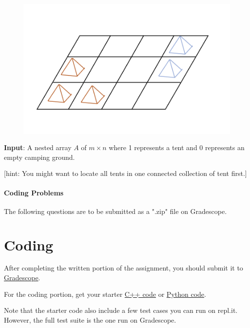 \documentclass [12pt]{article}
\begin{document}
\begin{figure}[H]
    \centering
    \includegraphics[scale=0.5]{tent.png} 
    \label{fig:my_label}
\end{figure}

\textbf{Input}: A nested array $A$ of $m \times n$ where 1 represents a tent and 0 represents an empty camping ground. 

[hint: You might want to locate all tents in one connected collection of tent first.] 



\pagebreak
\begin{Instruction}

\paragraph{Coding Problems} The following questions are to be submitted as a ".zip" file on Gradescope. 

\end{Instruction}

\section{Coding }
After completing the written portion of the assignment, you should submit it to \href{https://www.gradescope.com/courses/350304}{Gradescope}.

For the coding portion, get your starter \href{https://replit.com/team/COMP285/HW6-Code}{C++ code} or \href{https://replit.com/team/COMP285/HW6-Code-Python}{Python code}.

Note that the starter code also include a few test cases you can run on repl.it. However, the full test suite is the one run on Gradescope.
\end{document}
